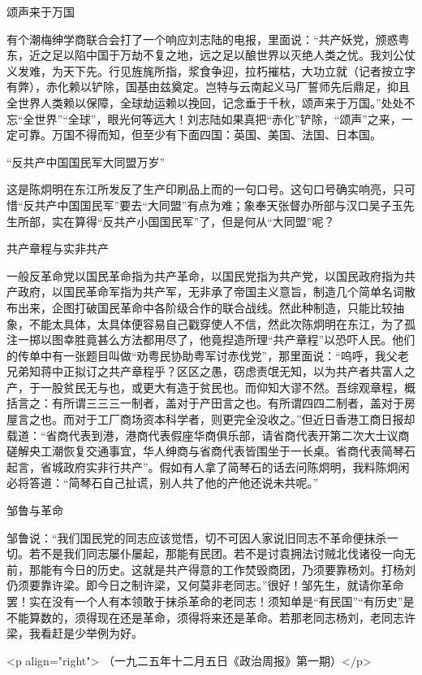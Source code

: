 颂声来于万国

有个潮梅绅学商联合会打了一个响应刘志陆的电报，里面说：“共产妖党，颁惑粤东，近之足以陷中国于万劫不复之地，远之足以酿世界以灭绝人类之忧。我刘公仗义发难，为天下先。行见旌旄所指，浆食争迎，拉朽摧枯，大功立就（记者按立字有弊），赤化赖以铲除，国基由兹奠定。岂特与云南起义马厂誓师先后鼎足，抑且全世界人类赖以保障，全球劫运赖以挽回，记念垂于千秋，颂声来于万国。”处处不忘“全世界”“全球”，眼光何等远大！刘志陆如果真把“赤化”铲除，“颂声”之来，一定可靠。万国不得而知，但至少有下面四国：英国、美国、法国、日本国。

“反共产中国国民军大同盟万岁”

这是陈炯明在东江所发反了生产印刷品上而的一句口号。这句口号确实响亮，只可惜“反共产中国国民军”要去“大同盟”有点为难；象奉天张督办所部与汉口吴子玉先生所部，实在算得“反共产小国国民军”了，但是何从“大同盟”呢？

共产章程与实非共产

一般反革命党以国民革命指为共产革命，以国民党指为共产党，以国民政府指为共产政府，以国民革命军指为共产军，无非承了帝国主义意旨，制造几个简单名词散布出来，企图打破国民革命中各阶级合作的联合战线。然此种制造，只能比较抽象，不能太具体，太具体便容易自己戳穿使人不信，然此次陈炯明在东江，为了孤注一掷以图幸胜竟甚么方法都用尽了，他竟揑造所理“共产章程”以恐吓人民。他们的传单中有一张题目叫做“劝粤民协助粤军讨赤伐党”，那里面说：“呜呼，我父老兄弟知蒋中正拟订之共产章程乎？区区之愚，窃虑责氓无知，以为共产者共富人之产，于一股贫民无与也，或更大有造于贫民也。而仰知大谬不然。吾综观章程，概括言之：有所谓三三三一制者，盖对于产田言之也。有所谓四四二制者，盖对于房屋言之也。而对于工厂商场资本科学者，则更完全没收之。”但近日香港工商日报却载道：“省商代表到港，港商代表假座华商俱乐部，请省商代表开第二次大士议商磋解央工潮恢复交通事宜，华人绅商与省商代表皆围坐于一长桌。省商代表简琴石起言，省城政府实非行共产”。假如有人拿了简琴石的话去问陈炯明，我料陈炯闲必将答道：“简琴石自己扯谎，别人共了他的产他还说未共呢。”

邹鲁与革命

邹鲁说：“我们国民党的同志应该觉悟，切不可因人家说旧同志不革命便抹杀一切。若不是我们同志屡仆屡起，那能有民团。若不是讨袁拥法讨贼北伐诸役一向无前，那能有今日的历史。这就是共产得意的工作焚毁商团，乃须要靠杨刘。打杨刘仍须要靠许梁。即今日之制许梁，又何莫非老同志。”很好！邹先生，就请你革命罢！实在没有一个人有本领敢于抹杀革命的老同志！须知单是“有民国”“有历史”是不能算数的，须得现在还是革命，须得将来还是革命。若那老同志杨刘，老同志许梁，我看赶是少举例为好。

<p align="right">
（一九二五年十二月五日《政治周报》第一期）</p>

